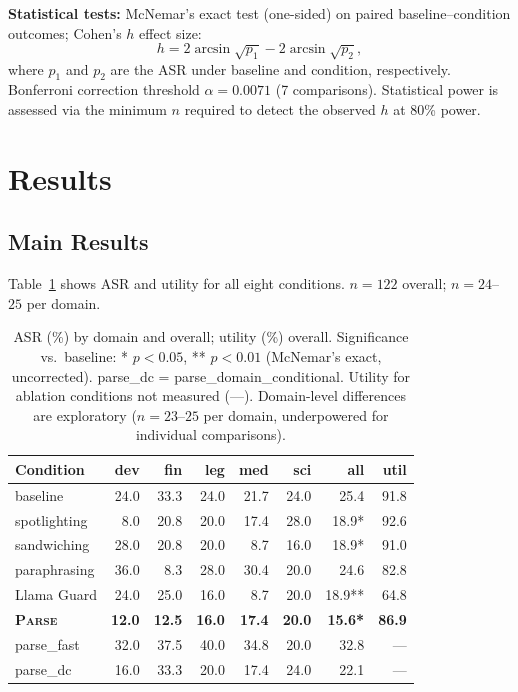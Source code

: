 \documentclass[11pt]{article}
\newcommand{\parse}{\textsc{Parse}\xspace}
\begin{document}
\textbf{Statistical tests:} McNemar's exact test (one-sided) on
paired baseline--condition outcomes; Cohen's $h$ effect size:
\[
h = 2\arcsin\!\sqrt{p_1} - 2\arcsin\!\sqrt{p_2},
\]
where $p_1$ and $p_2$ are the ASR under baseline and condition,
respectively.
Bonferroni correction threshold $\alpha{=}0.0071$ (7 comparisons).
Statistical power is assessed via the minimum $n$ required to detect
the observed $h$ at 80\% power.

\section{Results}

\subsection{Main Results}

Table~\ref{tab:main} shows ASR and utility for all eight conditions.
$n{=}122$ overall; $n{=}24$--$25$ per domain.

\begin{table}[t]
\centering
\small
\setlength{\tabcolsep}{5pt}
\begin{tabular}{lrrrrrr|r}
\toprule
\textbf{Condition} & \textbf{dev} & \textbf{fin} & \textbf{leg}
  & \textbf{med} & \textbf{sci}
  & \textbf{all} & \textbf{util} \\
\midrule
baseline          & 24.0 & 33.3 & 24.0 &  21.7 & 24.0 & 25.4  & 91.8 \\
spotlighting      &  8.0 & 20.8 & 20.0 &  17.4 & 28.0 & 18.9* & 92.6 \\
sandwiching       & 28.0 & 20.8 & 20.0 &   8.7 & 16.0 & 18.9* & 91.0 \\
paraphrasing      & 36.0 &  8.3 & 28.0 &  30.4 & 20.0 & 24.6  & 82.8 \\
Llama Guard       & 24.0 & 25.0 & 16.0 &   8.7 & 20.0 & 18.9**& 64.8 \\
\midrule
\textbf{\parse}   & \textbf{12.0} & \textbf{12.5} & \textbf{16.0}
  & \textbf{17.4} & \textbf{20.0}
  & \textbf{15.6*} & \textbf{86.9} \\
parse\_fast       & 32.0 & 37.5 & 40.0 & 34.8 & 20.0 & 32.8  & --- \\
parse\_dc         & 16.0 & 33.3 & 20.0 & 17.4 & 24.0 & 22.1  & --- \\
\bottomrule
\end{tabular}
\caption{ASR (\%) by domain and overall; utility (\%) overall.
Significance vs.\ baseline: * $p{<}0.05$, ** $p{<}0.01$
(McNemar's exact, uncorrected). parse\_dc = parse\_domain\_conditional.
Utility for ablation conditions not measured (---).
Domain-level differences are exploratory ($n{=}23$--$25$ per domain,
underpowered for individual comparisons).}
\label{tab:main}
\end{table}
\end{document}
